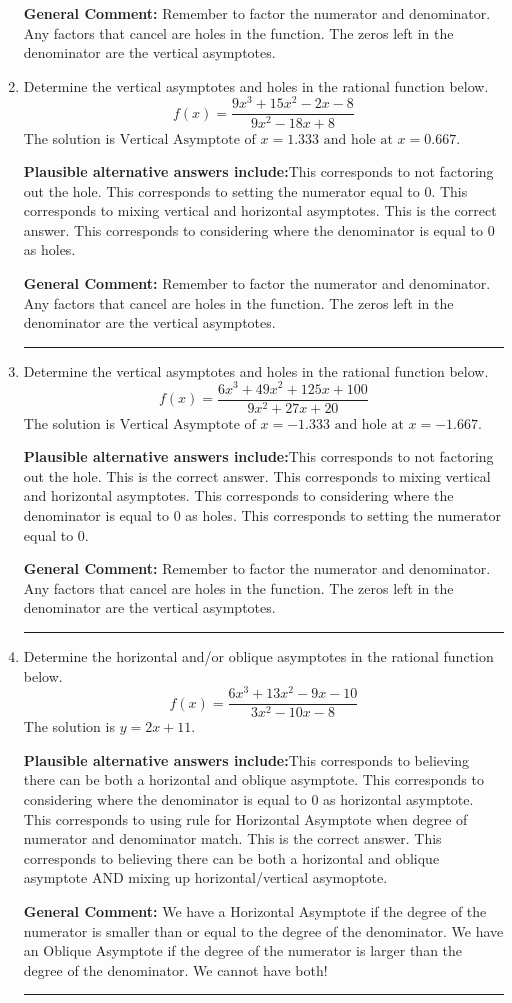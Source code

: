 \documentclass{extbook}[14pt]
\newcommand{\litem}[1]{\item #1

\rule{\textwidth}{0.4pt}}
\begin{document}
\begin{enumerate}
{\textbf{General Comment:} Remember to factor the numerator and denominator. Any factors that cancel are holes in the function. The zeros left in the denominator are the vertical asymptotes.
}
\litem{
Determine the vertical asymptotes and holes in the rational function below.
\[ f(x) = \frac{9x^{3} +15 x^{2} -2 x -8}{9x^{2} -18 x + 8} \]The solution is \( \text{Vertical Asymptote of } x = 1.333 \text{ and hole at } x = 0.667 \).\begin{enumerate}[label=\Alph*.]
\textbf{Plausible alternative answers include:}This corresponds to not factoring out the hole.
This corresponds to setting the numerator equal to 0.
This corresponds to mixing vertical and horizontal asymptotes.
This is the correct answer.
This corresponds to considering where the denominator is equal to 0 as holes.
\end{enumerate}

\textbf{General Comment:} Remember to factor the numerator and denominator. Any factors that cancel are holes in the function. The zeros left in the denominator are the vertical asymptotes.
}
\litem{
Determine the vertical asymptotes and holes in the rational function below.
\[ f(x) = \frac{6x^{3} +49 x^{2} +125 x + 100}{9x^{2} +27 x + 20} \]The solution is \( \text{Vertical Asymptote of } x = -1.333 \text{ and hole at } x = -1.667 \).\begin{enumerate}[label=\Alph*.]
\textbf{Plausible alternative answers include:}This corresponds to not factoring out the hole.
This is the correct answer.
This corresponds to mixing vertical and horizontal asymptotes.
This corresponds to considering where the denominator is equal to 0 as holes.
This corresponds to setting the numerator equal to 0.
\end{enumerate}

\textbf{General Comment:} Remember to factor the numerator and denominator. Any factors that cancel are holes in the function. The zeros left in the denominator are the vertical asymptotes.
}
\litem{
Determine the horizontal and/or oblique asymptotes in the rational function below.
\[ f(x) = \frac{6x^{3} +13 x^{2} -9 x -10}{3x^{2} -10 x -8} \]The solution is \( y = 2x + 11 \).\begin{enumerate}[label=\Alph*.]
\textbf{Plausible alternative answers include:}This corresponds to believing there can be both a horizontal and oblique asymptote.
This corresponds to considering where the denominator is equal to 0 as horizontal asymptote.
This corresponds to using rule for Horizontal Asymptote when degree of numerator and denominator match.
This is the correct answer.
This corresponds to believing there can be both a horizontal and oblique asymptote AND mixing up horizontal/vertical asymoptote.
\end{enumerate}

\textbf{General Comment:} We have a Horizontal Asymptote if the degree of the numerator is smaller than or equal to the degree of the denominator. We have an Oblique Asymptote if the degree of the numerator is larger than the degree of the denominator. We cannot have both!
}
\end{enumerate}
\end{document}
